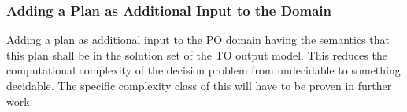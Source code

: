 \documentclass[letterpaper]{article} %
\begin{document}
\subsubsection{Adding a Plan as Additional Input to the Domain}
Adding a plan as additional input to the PO domain having the
semantics that this plan shall be in the solution set of the TO output
model. This reduces the computational complexity of the decision problem from undecidable to something decidable. The specific complexity class of this will have to be proven in further work.  %








\end{document}
